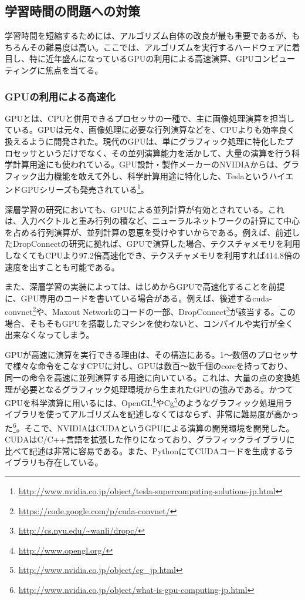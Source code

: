 \subsection{学習時間の問題への対策}
\label{subsec:c4_provision_exectime}
学習時間を短縮するためには、アルゴリズム自体の改良が最も重要であるが、もちろんその難易度は高い。ここでは、アルゴリズムを実行するハードウェアに着目し、特に近年盛んになっているGPUの利用による高速演算、GPUコンピューティングに焦点を当てる。
\subsubsection{GPUの利用による高速化}
GPUとは、CPUと併用できるプロセッサの一種で、主に画像処理演算を担当している。GPUは元々、画像処理に必要な行列演算などを、CPUよりも効率良く扱えるように開発された。現代のGPUは、単にグラフィック処理に特化したプロセッサというだけでなく、その並列演算能力を活かして、大量の演算を行う科学計算用途にも使われている。GPU設計・製作メーカーのNVIDIAからは、グラフィック出力機能を敢えて外し、科学計算用途に特化した、TeslaというハイエンドGPUシリーズも発売されている\footnote{\url{http://www.nvidia.co.jp/object/tesla-supercomputing-solutions-jp.html}}。\par 
深層学習の研究においても、GPUによる並列計算が有効とされている。これは、入力ベクトルと重み行列の積など、ニューラルネットワークの計算にて中心を占める行列演算が、並列計算の恩恵を受けやすいからである\cite{bengio2012practical}。例えば、前述したDropConnectの研究\cite{wan2013regularization}に拠れば、GPUで演算した場合、テクスチャメモリを利用しなくてもCPUより97.2倍高速化でき、テクスチャメモリを利用すれば414.8倍の速度を出すことも可能である。\par
また、深層学習の実装によっては、はじめからGPUで高速化することを前提に、GPU専用のコードを書いている場合がある。例えば、後述するcuda-convnet\footnote{\url{https://code.google.com/p/cuda-convnet/}}や、Maxout Network\cite{goodfellow2013maxout}のコードの一部、DropConnect\cite{wan2013regularization}\footnote{\url{http://cs.nyu.edu/~wanli/dropc/}}が該当する。この場合、そもそもGPUを搭載したマシンを使わないと、コンパイルや実行が全く出来なくなってしまう。\par
GPUが高速に演算を実行できる理由は、その構造にある。1〜数個のプロセッサで様々な命令をこなすCPUに対し、GPUは数百〜数千個のcoreを持っており、同一の命令を高速に並列演算する用途に向いている。これは、大量の点の変換処理が必要となるグラフィック処理環境から生まれたGPUの強みである。かつてGPUを科学演算に用いるには、OpenGL\footnote{\url{http://www.opengl.org/}}やCg\footnote{\url{http://www.nvidia.co.jp/object/cg_jp.html}}のようなグラフィック処理用ライブラリを使ってアルゴリズムを記述しなくてはならず、非常に難易度が高かった\footnote{\url{http://www.nvidia.co.jp/object/what-is-gpu-computing-jp.html}}。そこで、NVIDIAはCUDAというGPUによる演算の開発環境を開発した\cite{garland2008parallel}。CUDAはC/C++言語を拡張した作りになっており、グラフィックライブラリに比べて記述は非常に容易である。また、PythonにてCUDAコードを生成するライブラリも存在している\cite{kloeckner2009pycuda:}\cite{klockner2012pycuda}。\par
